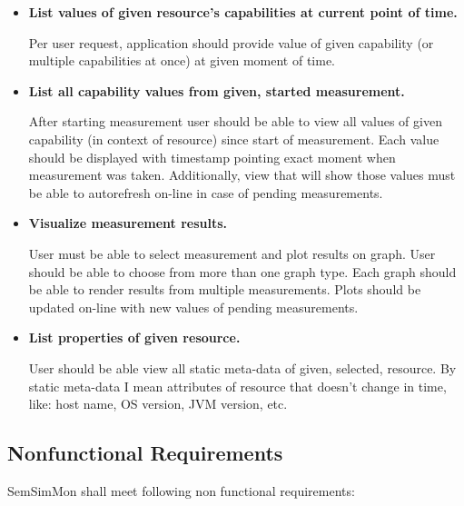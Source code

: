 \begin{itemize}
 \item {\bf List values of given resource's capabilities at current point of time.}

Per user request, application should provide value of given capability (or multiple capabilities at once) at
given moment of time.

 \item {\bf List all capability values from given, started measurement.}

After starting measurement user should be able to view all values of given capability (in context of resource) since
start of measurement. Each value should be displayed with timestamp pointing exact moment when measurement was
taken. Additionally, view that will show those values must be able to autorefresh on-line in case of pending
measurements.

 \item {\bf Visualize measurement results.}

User must be able to select measurement and plot results on graph. User should be able to choose from more than one
graph type. Each graph should be able to render results from multiple measurements. Plots should be updated on-line with
new values of pending measurements.

\item {\bf List properties of given resource.}

User should be able view all static meta-data of given, selected, resource. By static meta-data I mean attributes of
resource that doesn't change in time, like: host name, OS version, JVM version, etc.

\end{itemize}


\subsection{Nonfunctional Requirements}
\label{subsec:NonFunctionalRequirements}

SemSimMon shall meet following non functional requirements:

